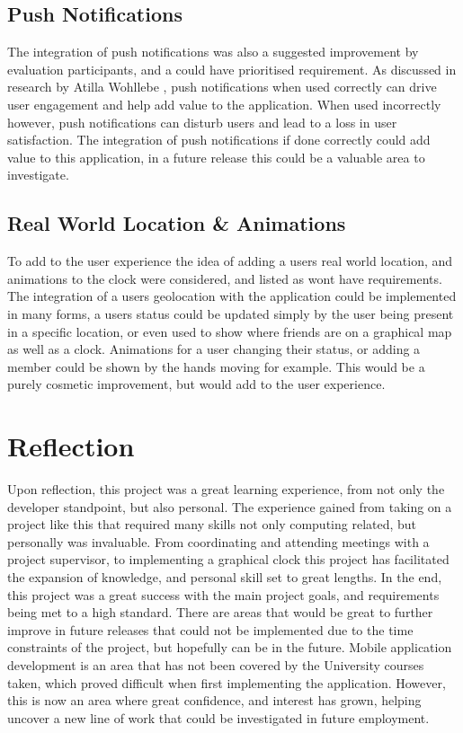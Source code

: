 \subsection*{Push Notifications}
The integration of push notifications was also a suggested improvement by evaluation participants, and a could have prioritised requirement. As discussed in research by Atilla Wohllebe \cite{pushNoti}, push notifications when used correctly can drive user engagement and help add value to the application. When used incorrectly however, push notifications can disturb users and lead to a loss in user satisfaction. The integration of push notifications if done correctly could add value to this application, in a future release this could be a valuable area to investigate.

\subsection*{Real World Location \& Animations}
To add to the user experience the idea of adding a users real world location, and animations to the clock were considered, and listed as wont have requirements. The integration of a users geolocation with the application could be implemented in many forms, a users status could be updated simply by the user being present in a specific location, or even used to show where friends are on a graphical map as well as a clock. Animations for a user changing their status, or adding a member could be shown by the hands moving for example. This would be a purely cosmetic improvement, but would add to the user experience.

\section{Reflection}

Upon reflection, this project was a great learning experience, from not only the developer standpoint, but also personal. The experience gained from taking on a project like this that required many skills not only computing related, but personally was invaluable. From coordinating and attending meetings with a project supervisor, to implementing a graphical clock this project has facilitated the expansion of knowledge, and personal skill set to great lengths. In the end, this project was a great success with the main project goals, and requirements being met to a high standard. There are areas that would be great to further improve in future releases that could not be implemented due to the time constraints of the project, but hopefully can be in the future. Mobile application development is an area that has not been covered by the University courses taken, which proved difficult when first implementing the application. However, this is now an area where great confidence, and interest has grown, helping uncover a new line of work that could be investigated in future employment.  